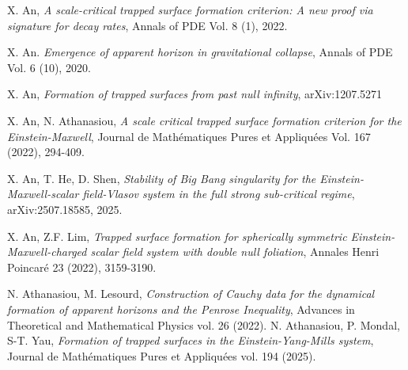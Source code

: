 \documentclass{article}[11pt]
\numberwithin{equation}{section}
\begin{document}
\begin{thebibliography}{}
X. An, \textit{A scale-critical trapped surface formation criterion: A new proof via signature for decay rates}, Annals of PDE {Vol. 8} (1), 2022.

  X. An. \textit{Emergence of apparent horizon in gravitational collapse}, Annals of PDE Vol. 6 (10), 2020.

 X. An, \textit{Formation of trapped surfaces from past null infinity}, arXiv:1207.5271 

 X. An, N. Athanasiou, \textit{A scale critical trapped surface formation criterion for the Einstein-Maxwell}, Journal de Mathématiques Pures et Appliquées Vol. 167 (2022), 294-409.


 X. An, T. He, D. Shen, \textit{Stability of Big Bang singularity for the Einstein-Maxwell-scalar field-Vlasov system in the full strong sub-critical regime}, arXiv:2507.18585, 2025.  


 X. An, Z.F. Lim, \textit{Trapped surface formation for spherically symmetric Einstein-Maxwell-charged scalar field system with double null foliation}, Annales Henri Poincar\'e 23 (2022), 3159-3190.










N. Athanasiou, M. Lesourd, \textit{Construction of Cauchy data for the dynamical formation of apparent horizons and the Penrose Inequality}, Advances in Theoretical and Mathematical Physics vol. 26 (2022). 
 N. Athanasiou, P. Mondal, S-T. Yau, \textit{Formation of trapped surfaces in the Einstein-Yang-Mills system}, Journal de Math{\'e}matiques Pures et Appliqu{\'e}es vol. 194 (2025).  


\end{thebibliography}
\end{document}
